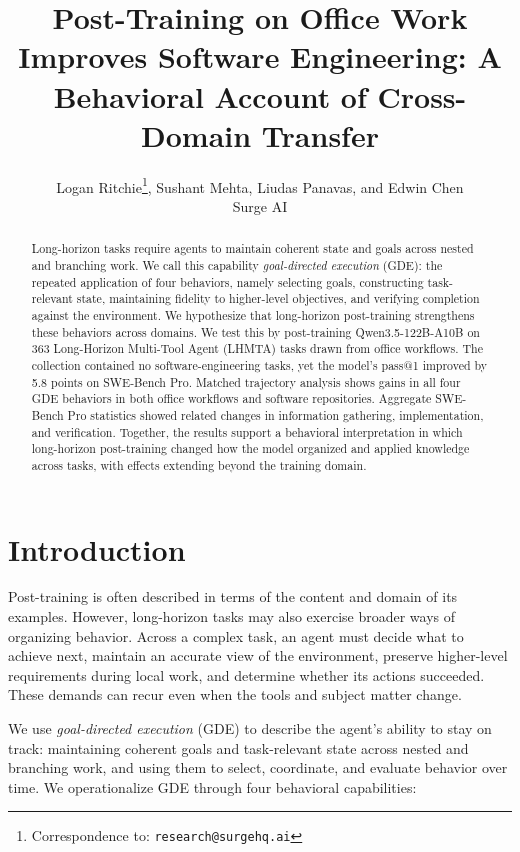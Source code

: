 \documentclass{article}
\title{Post-Training on Office Work Improves Software Engineering: A Behavioral Account of Cross-Domain Transfer}
\author{
  Logan Ritchie\thanks{Correspondence to: \texttt{research@surgehq.ai}},
  Sushant Mehta, Liudas Panavas, and Edwin Chen\\
  Surge AI
}
\date{}
\begin{document}
\maketitle

\begin{abstract}
Long-horizon tasks require agents to maintain coherent state and goals across nested and branching work. We call this capability \emph{goal-directed execution} (GDE): the repeated application of four behaviors, namely selecting goals, constructing task-relevant state, maintaining fidelity to higher-level objectives, and verifying completion against the environment. We hypothesize that long-horizon post-training strengthens these behaviors across domains. We test this by post-training Qwen3.5-122B-A10B on 363 Long-Horizon Multi-Tool Agent (LHMTA) tasks drawn from office workflows. The collection contained no software-engineering tasks, yet the model's pass@1 improved by 5.8 points on SWE-Bench Pro. Matched trajectory analysis shows gains in all four GDE behaviors in both office workflows and software repositories. Aggregate SWE-Bench Pro statistics showed related changes in information gathering, implementation, and verification. Together, the results support a behavioral interpretation in which long-horizon post-training changed how the model organized and applied knowledge across tasks, with effects extending beyond the training domain.
\end{abstract}

\section{Introduction}
\label{sec:intro}

Post-training is often described in terms of the content and domain of its examples. However, long-horizon tasks may also exercise broader ways of organizing behavior. Across a complex task, an agent must decide what to achieve next, maintain an accurate view of the environment, preserve higher-level requirements during local work, and determine whether its actions succeeded. These demands can recur even when the tools and subject matter change.

We use \emph{goal-directed execution} (GDE) to describe the agent's ability to stay on track: maintaining coherent goals and task-relevant state across nested and branching work, and using them to select, coordinate, and evaluate behavior over time. We operationalize GDE through four behavioral capabilities:
\end{document}
